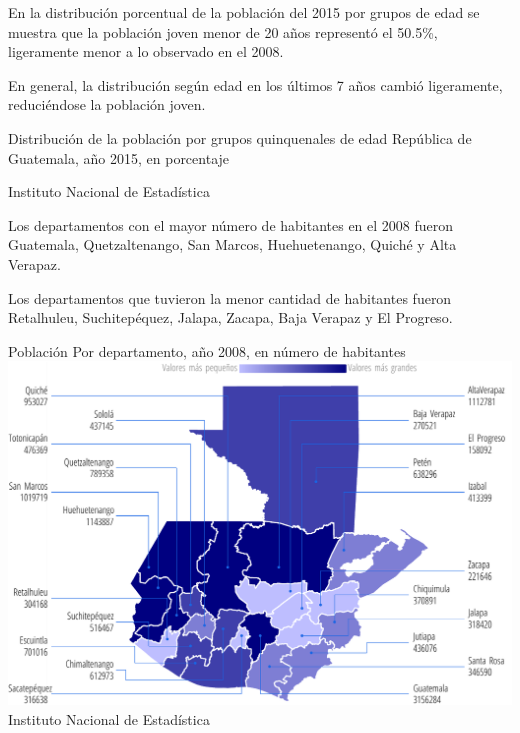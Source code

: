  
 {%
En la distribución porcentual de la población del 2015 por grupos de edad se muestra que la población joven menor de 20 años representó el 50.5\%, ligeramente menor a lo observado en el 2008. 

En general, la distribución según edad en los últimos 7 años cambió ligeramente, reduciéndose la población joven. }%
 {%
 	Distribución de la población por grupos quinquenales de edad} %
 {%
 	República de Guatemala, año 2015, en porcentaje} %
 {%
 	\begin{tikzpicture}[x=1pt,y=1pt]    \end{tikzpicture}}%
 {%
 	Instituto Nacional de Estadística} %
 
 
 
  
  {%
 Los departamentos con el mayor número de habitantes en el 2008 fueron Guatemala, Quetzaltenango, San Marcos, Huehuetenango, Quiché y Alta Verapaz.
 
 Los departamentos que tuvieron la menor cantidad de habitantes fueron Retalhuleu, Suchitepéquez, Jalapa, Zacapa, Baja Verapaz y El Progreso. }%
  {%
  Población
  	} %
  {%
  Por departamento, año 2008, en número de habitantes} %
  {%
  	 \includegraphics[width=52\cuadri]{graficas/1_02.pdf}}%
  {%
  	Instituto Nacional de Estadística} %
  
  
   
